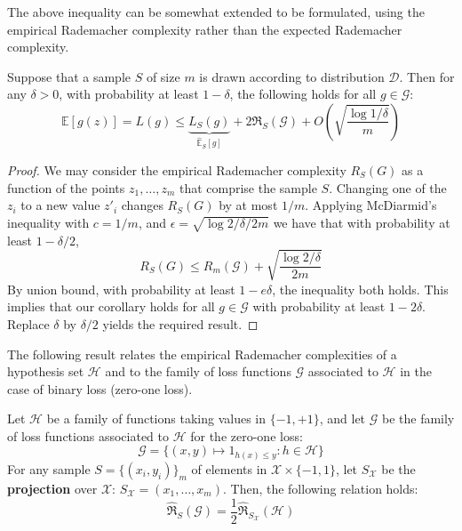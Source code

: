 The above inequality can be somewhat extended to be formulated, using the empirical Rademacher complexity rather than the expected Rademacher complexity. 

\begin{col}
    Suppose that a sample $S$ of size $m$ is drawn according to distribution $\mathcal{D}$. Then for any $\delta > 0$, with probability at least $1-\delta$, the following holds for all $g\in \mathcal{G}$: 
    \begin{equation}
    \mathbb{E}[g(z)] = L(g) \leq \underbrace{L_{S}(g)}_{\hat{\mathbb{E}}_{S}[g]} + 2\mathfrak{R}_{S}(\mathcal{G}) + O\left(\sqrt{\frac{\log{1/\delta}}{m}}\right)
\end{equation}
\end{col}
\begin{proof}
    We may consider the empirical Rademacher complexity $R_{S}(G)$ as a function of the points $z_{1},\dots,z_{m}$ that comprise the sample $S$. Changing one of the $z_{i}$ to a new value $z'_{i}$ changes $R_{S}(G)$ by at most $1/m$. Applying McDiarmid's inequality with $c=1/m$, and $\epsilon = \sqrt{\log{2/\delta}/2m}$ we have that with probability at least $1-\delta/2$, \begin{equation}
        R_{S}(G) \leq R_{m}(\mathcal{G}) + \sqrt{\frac{\log{2/\delta}}{2m}}
    \end{equation}
    By union bound, with probability at least $1-e\delta$, the inequality both holds. This implies that our corollary holds for all $g\in \mathcal{G}$ with probability at least $1-2\delta$. Replace $\delta$ by $\delta/2$ yields the required result. 
\end{proof}



The following result relates the empirical Rademacher complexities of a hypothesis set $\mathcal{H}$ and to the family of loss functions $\mathcal{G}$ associated to $\mathcal{H}$ in the case of binary loss (zero-one loss). 

\begin{lemma}
    Let $\mathcal{H}$ be a family of functions taking values in $\{-1,+1\}$, and let $\mathcal{G}$ be the family of loss functions associated to $\mathcal{H}$ for the zero-one loss: $$\mathcal{G}= \{(x,y)\mapsto 1_{h(x)\leq y}: h\in \mathcal{H}\}$$ For any sample $S=\{(x_i,y_i)\}_{m}$ of elements in $\mathcal{X}\times \{-1,1\}$, let $S_{\mathcal{X}}$ be the \textbf{projection} over $\mathcal{X}$: $S_{\mathcal{X}}=(x_1,\dots,x_m)$. Then, the following relation holds: 
    \begin{equation}
        \hat{\mathfrak{R}}_{S}(\mathcal{G}) = \frac{1}{2} \hat{\mathfrak{R}}_{S_{\mathcal{X}}}(\mathcal{H})
    \end{equation}
\end{lemma}

